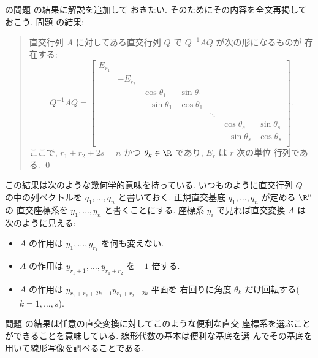 \documentclass[12pt,twoside]{jarticle}
\begin{document}
の問題  の結果に解説を追加して
おきたい.  そのためにその内容を全文再掲しておこう.
問題  の結果:
\begin{quote}
\begin{small}
  直交行列 $A$ に対してある直交行列 $Q$ で $Q^{-1}AQ$ が次の形になるものが
  存在する:
  \begin{equation*}
    Q^{-1}AQ =
    \begin{bmatrix}
      E_{r_1} &          &               &              &        & & \\
              & -E_{r_2} &               &              &        & & \\
              &          &  \cos\theta_1 & \sin\theta_1 &        & & \\
              &          & -\sin\theta_1 & \cos\theta_1 &        & & \\
              &          &               &              & \ddots & & \\
              &          &               &              &        &  \cos\theta_s & \sin\theta_s \\
              &          &               &              &        & -\sin\theta_s & \cos\theta_s \\
    \end{bmatrix}.
  \end{equation*}
  ここで, $r_1+r_2+2s=n$ かつ $\theta_k\in\R$ であり, $E_r$ は $r$ 次の単位
  行列である. 
  \qed
\end{small}
\end{quote}
この結果は次のような幾何学的意味を持っている.  
いつものように直交行列 $Q$ の中の列ベクトルを $q_1,\dots,q_n$ と書いておく.
正規直交基底 $q_1,\dots,q_n$ が定める $\R^n$ の
直交座標系を $y_1,\dots,y_n$ と書くことにする.
座標系 $y_i$ で見れば直交変換 $A$ は次のように見える:
\begin{itemize}
\item $A$ の作用は $y_1,\dots,y_{r_1}$ を何も変えない.
\item $A$ の作用は $y_{r_1+1},\dots,y_{r_1+r_2}$ を $-1$ 倍する.
\item $A$ の作用は $y_{r_1+r_2+2k-1}y_{r_1+r_2+2k}$ 平面を
  右回りに角度 $\theta_k$ だけ回転する($k=1,\dots,s$).
\end{itemize}
問題  の結果は任意の直交変換に対してこのような便利な直交
座標系を選ぶことができることを意味している.  線形代数の基本は便利な基底を選
んでその基底を用いて線形写像を調べることである.
\end{document}
